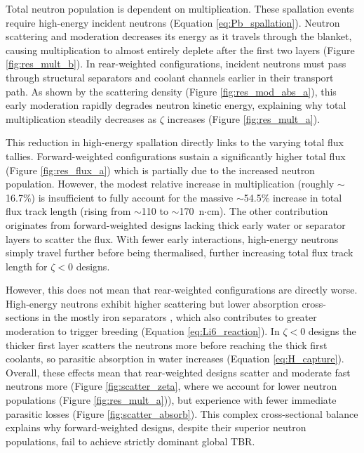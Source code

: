 \documentclass[11pt]{article}
\begin{document}
Total neutron population is dependent on  multiplication. These spallation events
require high-energy incident neutrons (Equation \ref{eq:Pb_spallation}). Neutron scattering and
moderation decreases its energy as it travels through the blanket, causing multiplication to almost
entirely deplete after the first two layers (Figure \ref{fig:res_mult_b}). In rear-weighted
configurations, incident neutrons must pass through structural separators and coolant
channels earlier in their transport path. As shown by the scattering density (Figure
\ref{fig:res_mod_abs_a}), this early moderation rapidly degrades neutron kinetic energy, explaining
why total multiplication steadily decreases as $\zeta$ increases (Figure \ref{fig:res_mult_a}).

This reduction in high-energy spallation directly links to the varying total flux tallies.
Forward-weighted configurations sustain a significantly higher total flux (Figure
\ref{fig:res_flux_a}) which is partially due to the increased neutron population. However, the
modest relative increase in multiplication (roughly $\sim$16.7\%) is insufficient to fully account
for the massive $\sim$54.5\% increase in total flux track length (rising from $\sim$110 to
$\sim$170~n$\cdot$cm). The other contribution originates from forward-weighted designs lacking thick
early water or separator layers to scatter the flux. With fewer early interactions, high-energy
neutrons simply travel further before being thermalised, further increasing total flux track length
for $\zeta < 0$ designs.

However, this does not mean that rear-weighted configurations are directly worse. High-energy
neutrons exhibit higher scattering but lower absorption cross-sections in the mostly iron separators
\citep{brown_endfb-viii0_2018}, which also contributes to greater moderation to trigger 
breeding (Equation \ref{eq:Li6_reaction}). In $\zeta<0$ designs the thicker first layer scatters the
neutrons more before reaching the thick first coolants, so parasitic absorption in water increases
(Equation \ref{eq:H_capture}). Overall, these effects mean that rear-weighted designs 
scatter and moderate fast neutrons more (Figure \ref{fig:scatter_zeta}, where we account for lower
neutron populations (Figure \ref{fig:res_mult_a})), but experience
with fewer immediate parasitic losses (Figure \ref{fig:scatter_absorb}). This complex
cross-sectional balance explains why forward-weighted designs, despite their superior neutron
populations, fail to achieve strictly dominant global TBR.
\end{document}
